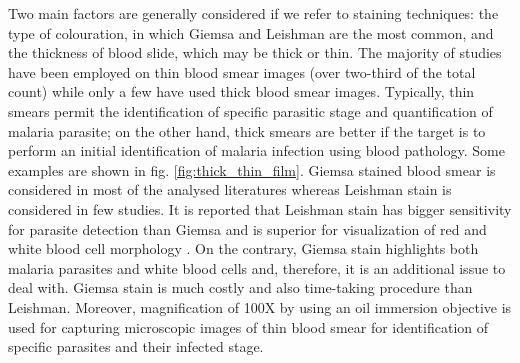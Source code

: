 \documentclass[sensors,review,submit,moreauthors,pdftex,10pt,a4paper]{mdpi}
\begin{document}
Two main factors are generally considered if we refer to staining techniques: the type of colouration, in which Giemsa and Leishman are the most common, and the thickness of blood slide, which may be thick or thin.
The majority of studies have been employed on thin blood smear images (over two-third of the total count) while only a few have used thick blood smear images.
Typically, thin smears permit the identification of specific parasitic stage and quantification of malaria parasite; on the other hand, thick smears are better if the target is to perform an initial identification of malaria infection using blood pathology. Some examples are shown in fig. \ref{fig:thick_thin_film}.
Giemsa stained blood smear is considered in most of the analysed literatures whereas Leishman stain is considered in few studies. %
It is reported that Leishman stain has bigger sensitivity for parasite detection than Giemsa \cite{Khan2014} and is superior for visualization of red and white blood cell morphology \cite{Sathpathi2014}. On the contrary, Giemsa stain highlights both malaria parasites and white blood cells and, therefore, it is an additional issue to deal with.
Giemsa stain is much costly and also time-taking procedure than Leishman.
Moreover, magnification of 100X by using an oil immersion objective is used for capturing microscopic images of thin blood smear for identification of specific parasites and their infected stage.
\end{document}
